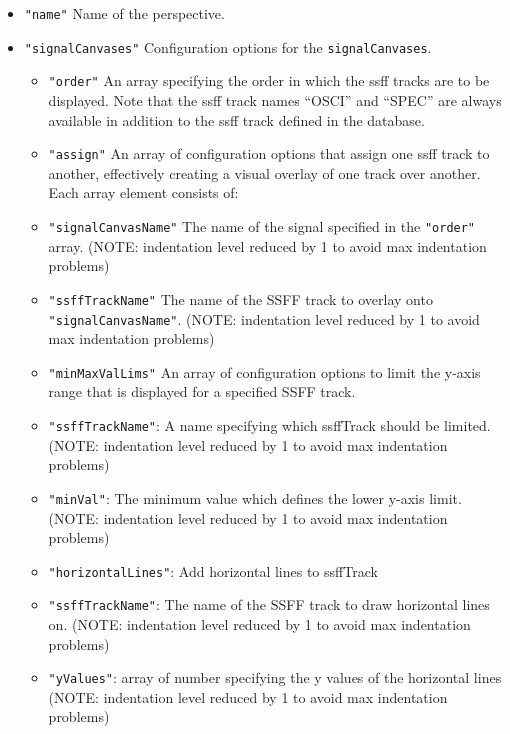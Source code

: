 \documentclass[]{book}
\begin{document}
\begin{itemize}
\begin{itemize}
    \begin{itemize}
    \item
      \texttt{"name"} Name of the perspective.
    \item
      \texttt{"signalCanvases"} Configuration options for the
      \texttt{signalCanvases}.

      \begin{itemize}
      \item
        \texttt{"order"} An array specifying the order in which the
        {ssff} tracks are to be
        displayed. Note that the {ssff} track names ``OSCI'' and
        ``SPEC'' are always available in addition to the
        {ssff} track defined in the
        database.
      \item
        \texttt{"assign"} An array of configuration options that assign
        one {ssff} track to another,
        effectively creating a visual overlay of one track over
        another. Each array element consists of:
      \item
        \texttt{"signalCanvasName"} The name of the signal specified in the \texttt{"order"} array. (NOTE: indentation level reduced by 1 to avoid max indentation problems)
      \item
        \texttt{"ssffTrackName"} The name of the SSFF track to overlay onto \texttt{"signalCanvasName"}. (NOTE: indentation level reduced by 1 to avoid max indentation problems)
      \item
        \texttt{"minMaxValLims"} An array of configuration options to limit the y-axis range that is displayed for a specified SSFF track.
      \item
        \texttt{"ssffTrackName"}: A name specifying which ssffTrack should be limited. (NOTE: indentation level reduced by 1 to avoid max indentation problems)
      \item
        \texttt{"minVal"}: The minimum value which defines the lower y-axis limit. (NOTE: indentation level reduced by 1 to avoid max indentation problems)
      \item
        \texttt{"horizontalLines"}: Add horizontal lines to ssffTrack
      \item
        \texttt{"ssffTrackName"}: The name of the SSFF track to draw horizontal lines on. (NOTE: indentation level reduced by 1 to avoid max indentation problems)
      \item
        \texttt{"yValues"}: array of number specifying the y values of the horizontal lines (NOTE: indentation level reduced by 1 to avoid max indentation problems)

\end{itemize}
\end{itemize}
\end{itemize}
\end{itemize}
\end{document}
